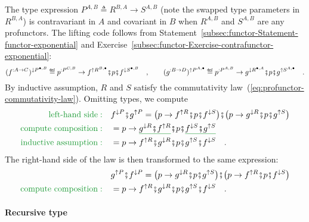 The type expression $P^{A,B}\triangleq R^{B,A}\rightarrow S^{A,B}$
(note the swapped type parameters in $R^{B,A}$) is contravariant
in $A$ and covariant in $B$ when $R^{A,B}$ and $S^{A,B}$ are any
profunctors. The lifting code follows from Statement~\ref{subsec:functor-Statement-functor-exponential}
and Exercise~\ref{subsec:functor-Exercise-contrafunctor-exponential}:
\[
(f^{:A\rightarrow C})^{\downarrow P^{\bullet,B}}\triangleq p^{:P^{C,B}}\rightarrow f^{\uparrow R^{B,\bullet}}\bef p\bef f^{\downarrow S^{\bullet,B}}\quad,\quad\quad(g^{:B\rightarrow D})^{\uparrow P^{A,\bullet}}\triangleq p^{:P^{A,B}}\rightarrow g^{\downarrow R^{\bullet,A}}\bef p\bef g^{\uparrow S^{A,\bullet}}\quad.
\]
By inductive assumption, $R$ and $S$ satisfy the commutativity law~(\ref{eq:profunctor-commutativity-law}).
Omitting types, we compute
\begin{align*}
{\color{greenunder}\text{left-hand side}:}\quad & f^{\downarrow P}\bef g^{\uparrow P}=\big(p\rightarrow f^{\uparrow R}\bef p\bef f^{\downarrow S}\big)\bef\big(p\rightarrow g^{\downarrow R}\bef p\bef g^{\uparrow S}\big)\\
{\color{greenunder}\text{compute composition}:}\quad & =p\rightarrow\gunderline{g^{\downarrow R}\bef f^{\uparrow R}}\bef p\bef\gunderline{f^{\downarrow S}\bef g^{\uparrow S}}\\
{\color{greenunder}\text{inductive assumption}:}\quad & =p\rightarrow f^{\uparrow R}\bef g^{\downarrow R}\bef p\bef g^{\uparrow S}\bef f^{\downarrow S}\quad.
\end{align*}
The right-hand side of the law is then transformed to the same expression:
\begin{align*}
 & g^{\uparrow P}\bef f^{\downarrow P}=\big(p\rightarrow g^{\downarrow R}\bef p\bef g^{\uparrow S}\big)\bef\big(p\rightarrow f^{\uparrow R}\bef p\bef f^{\downarrow S}\big)\\
{\color{greenunder}\text{compute composition}:}\quad & =p\rightarrow f^{\uparrow R}\bef g^{\downarrow R}\bef p\bef g^{\uparrow S}\bef f^{\downarrow S}\quad.
\end{align*}


\paragraph{Recursive type}

